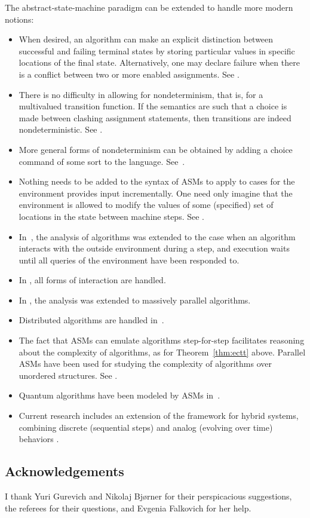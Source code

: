 \documentclass[copyright,creativecommons,english]{eptcs}
\begin{document}
The abstract-state-machine paradigm can be extended to handle more modern notions:
\begin{itemize}
\item
When desired, an algorithm can make an explicit distinction between successful and failing
terminal states by storing particular values
in specific locations of the final state.
Alternatively, one may declare failure when there is a conflict between two or more enabled assignments. See \cite{Gurevich94b}.
\item
There is no difficulty in allowing for nondeterminism, that is, for a multivalued transition function.
If the semantics are such that a choice is made between clashing assignment statements, then transitions are indeed nondeterministic.
See \cite{Gurevich94b,GY}.
\item
More general forms of nondeterminism can be obtained by adding a choice command of some sort to the language.
See~\cite{Gurevich94b}.
\item Nothing needs to be added to the syntax of ASMs to apply to cases for the environment provides input incrementally.
One need only imagine that the environment is allowed to modify the values of
some (specified) set of locations in the state between machine steps. See \cite{Gurevich94b}.
\item
In~\cite{Ord1,Ord2,Ord3}, 
the analysis of algorithms was extended to the case when an algorithm interacts with the outside environment during a step,
and execution waits until all queries of the environment have been responded to.
\item In \cite{General1,General2}, all forms of interaction are handled.
\item In \cite{parallel},
the analysis was extended to massively parallel algorithms.
\item
Distributed algorithms are handled in~\cite{Gurevich94b,Glausch}.
\item
The fact that ASMs can emulate algorithms step-for-step facilitates reasoning
about the complexity of algorithms, as for Theorem~\ref{thm:ectt} above.
Parallel ASMs have been used for studying the complexity of algorithms over unordered structures. See \cite{BGS,Spielmann}.
\item
Quantum algorithms have been modeled by ASMs in~\cite{Quantum}.
\item
Current research includes an extension of the framework for hybrid systems,
combining discrete (sequential steps) and analog (evolving over time) behaviors
\cite{Analog,TAMC}.
\end{itemize}

\subsection*{Acknowledgements}

I thank Yuri Gurevich and Nikolaj Bj{\o}rner  for their perspicacious suggestions,
the referees for their questions,
and Evgenia Falkovich for her help.



\end{document}
